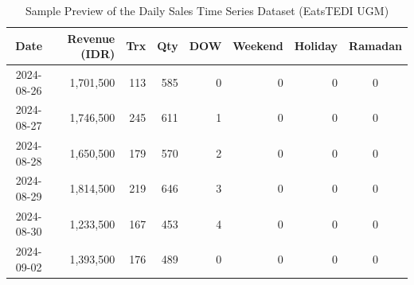 \documentclass[10pt,a4paper]{article}
\begin{document}
\begin{table}[htbp]
  \centering
  \caption{Sample Preview of the Daily Sales Time Series Dataset (EatsTEDI UGM)}
  \label{tab:sample_dataset}
  \fontsize{8pt}{10.5pt}\selectfont
  \begin{tabular}{crrrrrrc}
    \toprule
    \textbf{Date} & \textbf{Revenue (IDR)} & \textbf{Trx} & \textbf{Qty} & \textbf{DOW} & \textbf{Weekend} & \textbf{Holiday} & \textbf{Ramadan} \\
    \midrule
    2024-08-26 & 1,701,500 & 113 & 585 & 0 & 0 & 0 & 0 \\
    2024-08-27 & 1,746,500 & 245 & 611 & 1 & 0 & 0 & 0 \\
    2024-08-28 & 1,650,500 & 179 & 570 & 2 & 0 & 0 & 0 \\
    2024-08-29 & 1,814,500 & 219 & 646 & 3 & 0 & 0 & 0 \\
    2024-08-30 & 1,233,500 & 167 & 453 & 4 & 0 & 0 & 0 \\
    2024-09-02 & 1,393,500 & 176 & 489 & 0 & 0 & 0 & 0 \\
    \bottomrule
  \end{tabular}
\end{table}
\end{document}

